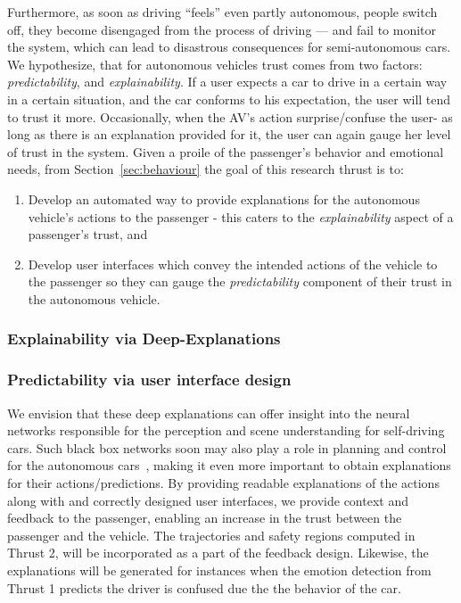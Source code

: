 Furthermore, as soon as driving ``feels'' even partly autonomous, people switch off, they become disengaged from the process of driving — and fail to monitor the system, which can lead to disastrous consequences for semi-autonomous cars.
We hypothesize, that for autonomous vehicles trust comes from two factors: \textit{predictability}, and \textit{explainability}.
If a user expects a car to drive in a certain way in a certain situation, and the car conforms to his expectation, the user will tend to trust it more.
Occasionally, when the AV’s action surprise/confuse the user- as long as there is an explanation provided for it, the user can again gauge her level of trust in the system.
Given a proile of the passenger's behavior and emotional needs, from Section~\ref{sec:behaviour} the goal of this research thrust is to:
\begin{enumerate}[itemsep=0pt,parsep=0pt,topsep=4pt,leftmargin=0.4in]
    \item Develop an automated way to provide explanations for the autonomous vehicle's actions to the passenger - this caters to the \textit{explainability} aspect of a passenger's trust, and
    \item Develop user interfaces which convey the intended actions of the vehicle to the passenger so they can gauge the \textit{predictability} component of their trust in the autonomous vehicle.
\end{enumerate}





\subsubsection{Explainability via Deep-Explanations }
\label{subsec:explainability}


\subsubsection{Predictability via user interface design}
\label{subsec:uid}


We envision that these deep explanations can offer insight into the neural networks responsible for the perception and scene understanding for self-driving cars. Such black box networks soon may also play a role in planning and control for the autonomous cars~\cite{bojarski2016end}, making it even more important to obtain explanations for their actions/predictions.
By providing readable explanations of the actions along with and correctly designed user interfaces, we provide context and feedback to the passenger, enabling an increase in the trust between the passenger and the vehicle.
The trajectories and safety regions computed in Thrust 2, will be incorporated as a part of the feedback design. 
Likewise, the explanations will be generated for instances when the emotion detection from Thrust 1 predicts the driver is confused due the the behavior of the car. 